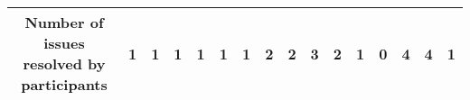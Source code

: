 \begin{table*}[]
\begin{adjustbox}{width=\textwidth,center}
{\begin{tabular}{|cll|ccc|ccc|ccc|ccc|ccc|}
\multicolumn{3}{|c|}{\textbf{Number of issues resolved by participants}}                                                                                                                                                                                                                                                                            & \multicolumn{1}{c|}{\textbf{1}}                                                                            & \multicolumn{1}{c|}{\textbf{1}}                                                                           & \textbf{1}                                                    & \multicolumn{1}{c|}{\textbf{1}}                                                                            & \multicolumn{1}{c|}{\textbf{1}}                                                                            & \textbf{1}                                                   & \multicolumn{1}{c|}{\textbf{2}}                                                                           & \multicolumn{1}{c|}{\textbf{2}}                                                                            & \textbf{3}                                                   & \multicolumn{1}{c|}{\textbf{2}}                                                                           & \multicolumn{1}{c|}{\textbf{1}}                                                                            & \textbf{0}                                                   & \multicolumn{1}{c|}{\textbf{4}}                                                                           & \multicolumn{1}{c|}{\textbf{4}}                                                                            & \textbf{1}                                                   \\ \hline

\end{tabular}}
\end{adjustbox}
\end{table*}

